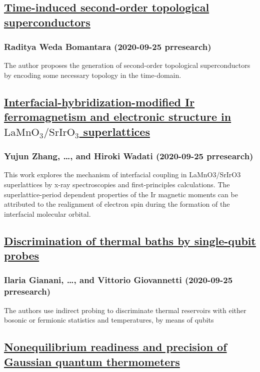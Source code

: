 \subsection*{\href{http://link.aps.org/doi/10.1103/PhysRevResearch.2.033495}{Time-induced second-order topological superconductors}}
\subsubsection*{Raditya Weda Bomantara (2020-09-25 prresearch)}
The author proposes the generation of second-order topological superconductors by encoding some necessary topology in the time-domain.
\subsection*{\href{http://link.aps.org/doi/10.1103/PhysRevResearch.2.033496}{Interfacial-hybridization-modified Ir ferromagnetism and electronic structure in ${\mathrm{LaMnO}}_{3}\text{/}{\mathrm{SrIrO}}_{3}$ superlattices}}
\subsubsection*{Yujun Zhang, \dots, and Hiroki Wadati (2020-09-25 prresearch)}
This work explores the mechanism of interfacial coupling in LaMnO3/SrIrO3 superlattices by x-ray spectroscopies and first-principles calculations. The superlattice-period dependent properties of the Ir magnetic moments can be attributed to the realignment of electron spin during the formation of the interfacial molecular orbital.
\subsection*{\href{http://link.aps.org/doi/10.1103/PhysRevResearch.2.033497}{Discrimination of thermal baths by single-qubit probes}}
\subsubsection*{Ilaria Gianani, \dots, and Vittorio Giovannetti (2020-09-25 prresearch)}
The authors use indirect probing to discriminate thermal reservoirs with either bosonic or fermionic statistics and temperatures, by means of qubits
\subsection*{\href{http://link.aps.org/doi/10.1103/PhysRevResearch.2.033498}{Nonequilibrium readiness and precision of Gaussian quantum thermometers}}
